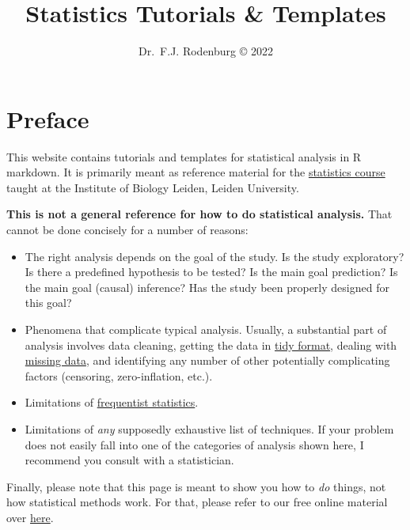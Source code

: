 \documentclass[
]{book}
\title{Statistics Tutorials \& Templates}
\author{Dr.~F.J. Rodenburg © 2022}
\date{}
\providecommand{\tightlist}{%
  \setlength{\itemsep}{0pt}\setlength{\parskip}{0pt}}
\begin{document}
\maketitle

{
\setcounter{tocdepth}{1}
\tableofcontents
}
\hypertarget{preface}{%
\chapter*{Preface}\label{preface}}

This website contains tutorials and templates for statistical analysis in R markdown. It is primarily meant as reference material for the \href{https://fransrodenburg.github.io/General-Research-Skills/}{statistics course} taught at the Institute of Biology Leiden, Leiden University.

\textbf{This is not a general reference for how to do statistical analysis.} That cannot be done concisely for a number of reasons:

\begin{itemize}
\tightlist
\item
  The right analysis depends on the goal of the study. Is the study exploratory? Is there a predefined hypothesis to be tested? Is the main goal prediction? Is the main goal (causal) inference? Has the study been properly designed for this goal?
\item
  Phenomena that complicate typical analysis. Usually, a substantial part of analysis involves data cleaning, getting the data in \href{https://r4ds.had.co.nz/tidy-data.html\#fig:tidy-structure}{tidy format}, dealing with \href{https://en.wikipedia.org/wiki/Missing_data\#Types}{missing data}, and identifying any number of other potentially complicating factors (censoring, zero-inflation, etc.).
\item
  Limitations of \href{https://en.wikipedia.org/wiki/Statistical_inference\#Paradigms_for_inference}{frequentist statistics}.
\item
  Limitations of \emph{any} supposedly exhaustive list of techniques. If your problem does not easily fall into one of the categories of analysis shown here, I recommend you consult with a statistician.
\end{itemize}

Finally, please note that this page is meant to show you how to \emph{do} things, not how statistical methods work. For that, please refer to our free online material over \href{https://fransrodenburg.github.io/General-Research-Skills/}{here}.
\end{document}
